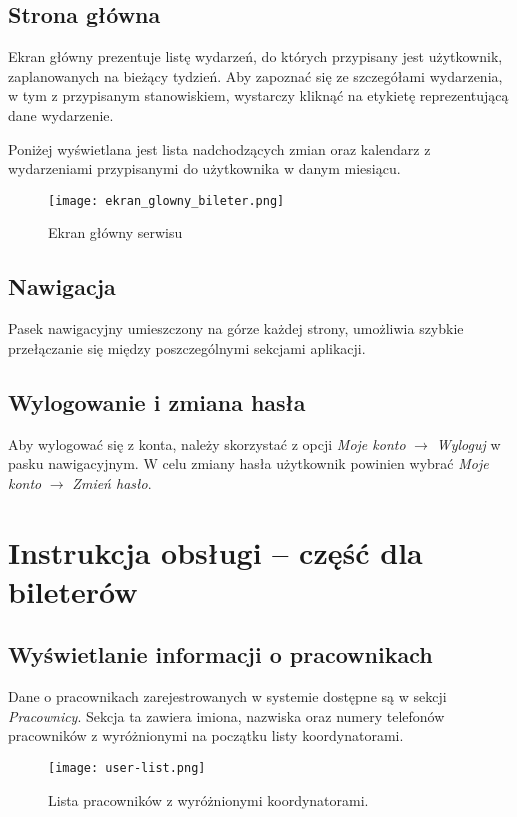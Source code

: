 \documentclass[shortabstract]{iithesis}
\begin{document}
\subsection{Strona główna}

Ekran główny prezentuje listę wydarzeń, do których przypisany jest użytkownik, zaplanowanych
na bieżący tydzień. Aby zapoznać się ze szczegółami wydarzenia, w tym z przypisanym stanowiskiem, wystarczy kliknąć na etykietę reprezentującą dane wydarzenie.

Poniżej wyświetlana jest lista nadchodzących zmian oraz kalendarz z wydarzeniami przypisanymi do użytkownika w danym miesiącu.

\begin{figure}[h]
    \centering
    \texttt{[image: ekran\_glowny\_bileter.png]}
    \caption{Ekran główny serwisu}
    \label{fig:glowny}
\end{figure}

\subsection{Nawigacja}
Pasek nawigacyjny umieszczony na górze każdej strony, umożliwia szybkie przełączanie się między poszczególnymi sekcjami aplikacji.

\subsection{Wylogowanie i zmiana hasła}
Aby wylogować się z konta, należy skorzystać z opcji \textit{Moje konto} $\rightarrow$ \textit{Wyloguj} w pasku nawigacyjnym. W celu zmiany hasła użytkownik powinien wybrać \textit{Moje konto} $\rightarrow$ \textit{Zmień hasło}.


\section{Instrukcja obsługi – część dla bileterów}

\subsection{Wyświetlanie informacji o pracownikach}

Dane o pracownikach zarejestrowanych w systemie dostępne są w sekcji \textit{Pracownicy}. Sekcja ta zawiera imiona, nazwiska oraz numery telefonów pracowników z wyróżnionymi na początku listy koordynatorami.

\begin{figure}[h]
    \centering
    \texttt{[image: user-list.png]}
    \caption{Lista pracowników z wyróżnionymi koordynatorami.}
    \label{fig:user-list}
\end{figure}
\end{document}
